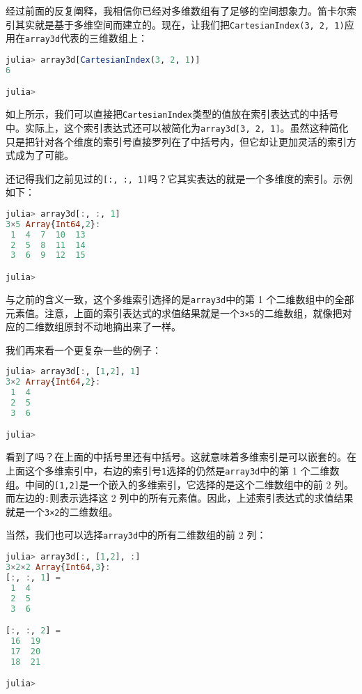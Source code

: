 经过前面的反复阐释，我相信你已经对多维数组有了足够的空间想象力。笛卡尔索引其实就是基于多维空间而建立的。现在，让我们把\verb|CartesianIndex(3, 2, 1)|应用在\verb|array3d|代表的三维数组上：

\begin{lstlisting}[language=julia]
julia> array3d[CartesianIndex(3, 2, 1)]
6

julia>
\end{lstlisting}

如上所示，我们可以直接把\verb|CartesianIndex|类型的值放在索引表达式的中括号中。实际上，这个索引表达式还可以被简化为\verb|array3d[3, 2, 1]|。虽然这种简化只是把针对各个维度的索引号直接罗列在了中括号内，但它却让更加灵活的索引方式成为了可能。

还记得我们之前见过的\verb|[:, :, 1]|吗？它其实表达的就是一个多维度的索引。示例如下：

\begin{lstlisting}[language=julia]
julia> array3d[:, :, 1]
3×5 Array{Int64,2}:
 1  4  7  10  13
 2  5  8  11  14
 3  6  9  12  15

julia> 
\end{lstlisting}

与之前的含义一致，这个多维索引选择的是\verb|array3d|中的第 1 个二维数组中的全部元素值。注意，上面的索引表达式的求值结果就是一个\verb|3×5|的二维数组，就像把对应的二维数组原封不动地摘出来了一样。

我们再来看一个更复杂一些的例子：

\begin{lstlisting}[language=julia]
julia> array3d[:, [1,2], 1]
3×2 Array{Int64,2}:
 1  4
 2  5
 3  6

julia> 
\end{lstlisting}

看到了吗？在上面的中括号里还有中括号。这就意味着多维索引是可以嵌套的。在上面这个多维索引中，右边的索引号\verb|1|选择的仍然是\verb|array3d|中的第 1 个二维数组。中间的\verb|[1,2]|是一个嵌入的多维索引，它选择的是这个二维数组中的前 2 列。而左边的\verb|:|则表示选择这 2 列中的所有元素值。因此，上述索引表达式的求值结果就是一个\verb|3×2|的二维数组。

当然，我们也可以选择\verb|array3d|中的所有二维数组的前 2 列：

\begin{lstlisting}[language=julia]
julia> array3d[:, [1,2], :]
3×2×2 Array{Int64,3}:
[:, :, 1] =
 1  4
 2  5
 3  6

[:, :, 2] =
 16  19
 17  20
 18  21

julia> 
\end{lstlisting}

